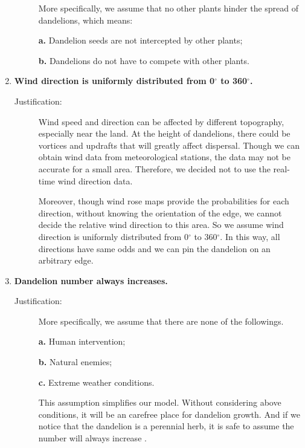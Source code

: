 \documentclass[12pt]{article}
\begin{document}
\begin{enumerate}
\begin{description}
				More specifically, we assume that no other plants hinder the spread of dandelions, which means:
				
				\textbf{a.} Dandelion seeds are not intercepted by other plants;
				
				\textbf{b.} Dandelions do not have to compete with other plants.  
				
			\end{description}
			
			\item \textbf{Wind direction is uniformly distributed from 0$^\circ$ to 360$^\circ$.}
			\vspace{-0.125in}
			\begin{description}
				\item[Justification:] \label{assumption:wind} Wind speed and direction can be affected by different topography, especially near the land. At the height of dandelions, there could be vortices and updrafts that will greatly affect dispersal.  Though we can obtain wind data from meteorological stations, the data may not be accurate for a  small area. Therefore, we decided not to use the real-time wind direction data.
				
				Moreover, though wind rose maps provide the probabilities for each direction, without knowing the orientation of the edge, we cannot decide the relative wind direction to this area.  So we assume wind direction is uniformly distributed from 0$^\circ$ to 360$^\circ$. In this way, all directions have same odds and we can pin the dandelion on an arbitrary edge.
			\end{description}
			
			\item \textbf{Dandelion number always increases.}
			\vspace{-0.125in}
			\begin{description}
				\item[Justification:] More specifically, we assume that there are none of the followings.
				 
				 \textbf{a.} Human intervention;
				 
				 \textbf{b.} Natural enemies;
				 
				 \textbf{c.} Extreme weather conditions.
				
				This assumption simplifies our model.  Without considering above conditions, it will be an carefree place for dandelion growth.  And if we notice that the dandelion is a perennial herb, it is safe to assume the number will always increase .
			\end{description}
			
		\end{enumerate}
		
\end{document}
